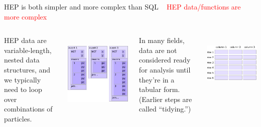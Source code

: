 \documentclass[aspectratio=169]{beamer}
\begin{document}
\begin{frame}{HEP is both simpler and more complex than SQL}
\vspace{0.35 cm}
\mbox{ } \hfill \textcolor{red}{\LARGE HEP data/functions are more complex} \hfill \mbox{ }

\vspace{-0.25 cm}
\begin{columns}[t]

HEP data are variable-length, nested data structures, and we typically need to loop over combinations of particles.

\vspace{0.25 cm}
\mbox{ } \hfill \includegraphics[width=0.8\linewidth]{event-structure.pdf} \hfill \hfill \mbox{ }


In many fields, data are not considered ready for analysis until they're in a tabular form. (Earlier steps are called ``tidying.'')

\vspace{0.25 cm}
\mbox{ } \hfill \includegraphics[width=0.8\linewidth]{table-structure.pdf} \hfill \hfill \mbox{ }

\end{columns}
\end{frame}
\end{document}
